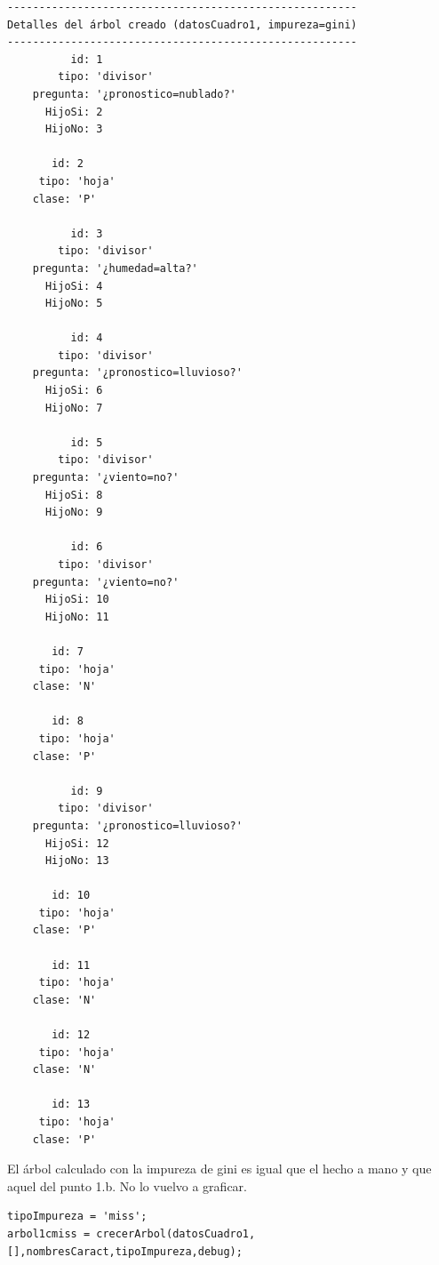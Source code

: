 \documentclass[11pt,a4paper,final]{article}
\begin{document}
\begin{verbatim}-------------------------------------------------------
Detalles del árbol creado (datosCuadro1, impureza=gini)
-------------------------------------------------------
          id: 1
        tipo: 'divisor'
    pregunta: '¿pronostico=nublado?'
      HijoSi: 2
      HijoNo: 3

       id: 2
     tipo: 'hoja'
    clase: 'P'

          id: 3
        tipo: 'divisor'
    pregunta: '¿humedad=alta?'
      HijoSi: 4
      HijoNo: 5

          id: 4
        tipo: 'divisor'
    pregunta: '¿pronostico=lluvioso?'
      HijoSi: 6
      HijoNo: 7

          id: 5
        tipo: 'divisor'
    pregunta: '¿viento=no?'
      HijoSi: 8
      HijoNo: 9

          id: 6
        tipo: 'divisor'
    pregunta: '¿viento=no?'
      HijoSi: 10
      HijoNo: 11

       id: 7
     tipo: 'hoja'
    clase: 'N'

       id: 8
     tipo: 'hoja'
    clase: 'P'

          id: 9
        tipo: 'divisor'
    pregunta: '¿pronostico=lluvioso?'
      HijoSi: 12
      HijoNo: 13

       id: 10
     tipo: 'hoja'
    clase: 'P'

       id: 11
     tipo: 'hoja'
    clase: 'N'

       id: 12
     tipo: 'hoja'
    clase: 'N'

       id: 13
     tipo: 'hoja'
    clase: 'P'
\end{verbatim}
    
El árbol calculado con la impureza de gini es igual que el hecho a mano y que aquel del punto 1.b.
No lo vuelvo a graficar.

\begin{verbatim}
tipoImpureza = 'miss';
arbol1cmiss = crecerArbol(datosCuadro1, [],nombresCaract,tipoImpureza,debug);
\end{verbatim}
\end{document}
